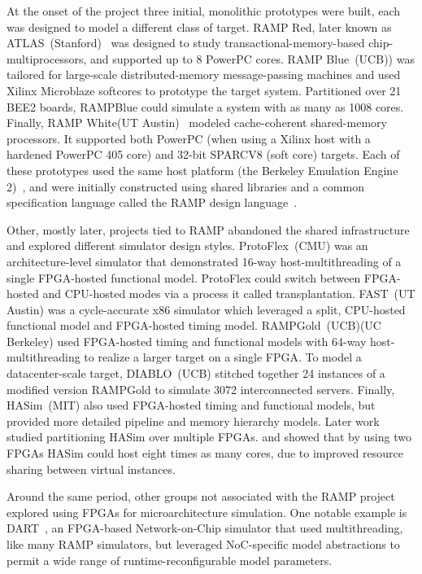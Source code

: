 At the onset of the project three initial, monolithic prototypes were built,
each was designed to model a different class of target.
RAMP Red, later known as ATLAS~(Stanford)~\cite{ATLAS} was designed to study transactional-memory-based chip-multiprocessors, and supported up to 8 PowerPC cores.
RAMP Blue~(UCB)\cite{RAMPBlue}) was tailored for large-scale distributed-memory message-passing machines and used Xilinx
Microblaze softcores to prototype the target system. Partitioned over 21
BEE2 boards, RAMPBlue could simulate a system with as many as 1008 cores.
Finally, RAMP White(UT Austin)~\cite{RAMPWhite} modeled cache-coherent
shared-memory processors. It supported both PowerPC (when using a Xilinx
host with a hardened PowerPC 405 core) and 32-bit SPARCV8 (soft core) targets.
Each of these prototypes used the same host platform (the Berkeley Emulation
Engine 2)~\cite{BEE2}, and were initially constructed using shared libraries and a common
specification language called the RAMP design language~\cite{RDL}.

Other, mostly later, projects tied to RAMP abandoned the shared infrastructure
and explored different simulator design styles.
ProtoFlex~(CMU)\cite{ProtoFlex} was an architecture-level simulator that
demonstrated 16-way host-multithreading of a single FPGA-hosted functional
model.  ProtoFlex could switch between FPGA-hosted and CPU-hosted modes via
a process it called transplantation. FAST~(UT Austin)\cite{FAST} was a cycle-accurate
x86 simulator which leveraged a split, CPU-hosted functional model and FPGA-hosted
timing model. RAMPGold~(UCB)\cite{RAMPGold}(UC Berkeley) used FPGA-hosted timing
and functional models with 64-way host-multithreading to realize a larger
target on a single FPGA.  To model a datacenter-scale target,
DIABLO~(UCB)\cite{Diablo} stitched together 24 instances of a modified version RAMPGold to simulate 3072 interconnected
servers.  Finally, HASim~\cite{HASim}(MIT) also used FPGA-hosted timing and
functional models, but provided more detailed pipeline and memory hierarchy
models. Later work studied partitioning HASim over multiple FPGAs.
\cite{LIFPGADesign} and showed that by using two FPGAs HASim could host eight
times as many cores, due to improved resource sharing between virtual
instances.

Around the same period, other groups not associated with the RAMP project explored
using FPGAs for microarchitecture simulation.  One notable example is
DART~\cite{DART}, an FPGA-based Network-on-Chip simulator that used
multithreading, like many RAMP simulators, but leveraged NoC-specific model abstractions
to permit a wide range of runtime-reconfigurable model parameters.

